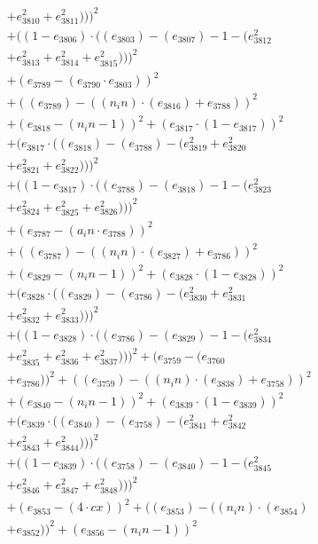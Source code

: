 \documentclass[10pt, a4paper]{article}
\begin{document}
\begin{align*}
& + e_{3810}^{2} + e_{3811}^{2})))^{2} \\
& + ((1 - e_{3806})  \cdot  ((e_{3803}) - (e_{3807}) - 1 - (e_{3812}^{2} \\
& + e_{3813}^{2} + e_{3814}^{2} + e_{3815}^{2})))^{2} \\
& + (e_{3789} - (e_{3790}  \cdot  e_{3803}))^{2} \\
& + ((e_{3789}) - ((n_in)  \cdot  (e_{3816}) + e_{3788}))^{2} \\
& + (e_{3818} - (n_in - 1))^{2} + (e_{3817}  \cdot  (1 - e_{3817}))^{2} \\
& + (e_{3817}  \cdot  ((e_{3818}) - (e_{3788}) - (e_{3819}^{2} + e_{3820}^{2} \\
& + e_{3821}^{2} + e_{3822}^{2})))^{2} \\
& + ((1 - e_{3817})  \cdot  ((e_{3788}) - (e_{3818}) - 1 - (e_{3823}^{2} \\
& + e_{3824}^{2} + e_{3825}^{2} + e_{3826}^{2})))^{2} \\
& + (e_{3787} - (a_in  \cdot  e_{3788}))^{2} \\
& + ((e_{3787}) - ((n_in)  \cdot  (e_{3827}) + e_{3786}))^{2} \\
& + (e_{3829} - (n_in - 1))^{2} + (e_{3828}  \cdot  (1 - e_{3828}))^{2} \\
& + (e_{3828}  \cdot  ((e_{3829}) - (e_{3786}) - (e_{3830}^{2} + e_{3831}^{2} \\
& + e_{3832}^{2} + e_{3833}^{2})))^{2} \\
& + ((1 - e_{3828})  \cdot  ((e_{3786}) - (e_{3829}) - 1 - (e_{3834}^{2} \\
& + e_{3835}^{2} + e_{3836}^{2} + e_{3837}^{2})))^{2} + (e_{3759} - (e_{3760} \\
& + e_{3786}))^{2} + ((e_{3759}) - ((n_in)  \cdot  (e_{3838}) + e_{3758}))^{2} \\
& + (e_{3840} - (n_in - 1))^{2} + (e_{3839}  \cdot  (1 - e_{3839}))^{2} \\
& + (e_{3839}  \cdot  ((e_{3840}) - (e_{3758}) - (e_{3841}^{2} + e_{3842}^{2} \\
& + e_{3843}^{2} + e_{3844}^{2})))^{2} \\
& + ((1 - e_{3839})  \cdot  ((e_{3758}) - (e_{3840}) - 1 - (e_{3845}^{2} \\
& + e_{3846}^{2} + e_{3847}^{2} + e_{3848}^{2})))^{2} \\
& + (e_{3853} - (4  \cdot  cx))^{2} + ((e_{3853}) - ((n_in)  \cdot  (e_{3854}) \\
& + e_{3852}))^{2} + (e_{3856} - (n_in - 1))^{2} \\

\end{align*}
\end{document}
